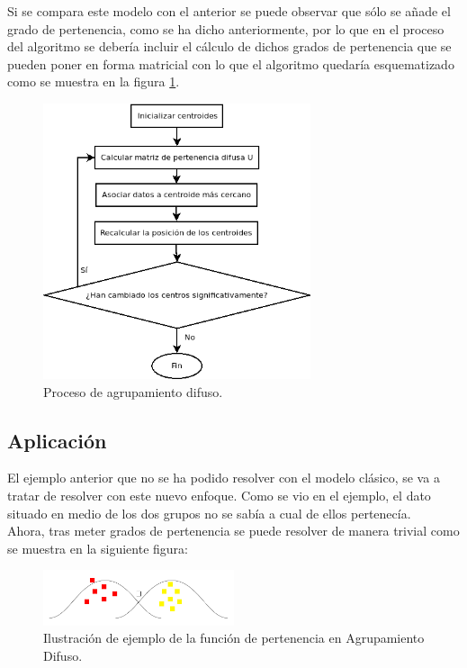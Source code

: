 \documentclass[]{report}
\begin{document}
			Si se compara este modelo con el anterior se puede observar que sólo se añade el grado de pertenencia, como se ha dicho anteriormente, por lo que en el proceso del algoritmo se debería incluir el cálculo de dichos grados de pertenencia que se pueden poner en forma matricial con lo que el algoritmo quedaría esquematizado como se muestra en la figura \ref{agrupamiento_difuso}.
			
			\begin{figure}[h!]
				\centering
				\includegraphics[width=0.7\textwidth]{agrupamiento-difuso.png}
				\caption{Proceso de agrupamiento difuso.}
				\label{agrupamiento_difuso}
			\end{figure}
		
			\subsection{Aplicación}
						
				El ejemplo anterior que no se ha podido resolver con el modelo clásico, se va a tratar de resolver con este nuevo enfoque. Como se vio en el ejemplo, el dato situado en medio de los dos grupos no se sabía a cual de ellos pertenecía.\\
				
				Ahora, tras meter grados de pertenencia se puede resolver de manera trivial como se muestra en la siguiente figura:
				
				\begin{figure}[h!]
					\centering
					\includegraphics[width=0.5\textwidth]{clustering_difuso.jpg}
					\caption{Ilustración de ejemplo de la función de pertenencia en Agrupamiento Difuso.}
					\label{clustering_difuso}
				\end{figure}
			
\end{document}
